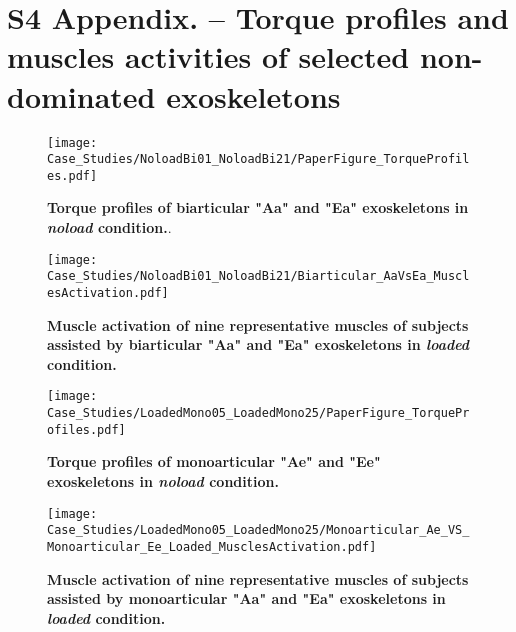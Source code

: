 \documentclass[10pt,letterpaper]{article}
\begin{document}
\section*{S4 Appendix. -- Torque profiles and muscles activities of selected non-dominated exoskeletons} %
\bigskip
\bigskip
\bigskip
\bigskip
\nolinenumbers
\renewcommand{\thefigure}{C\arabic{figure}}
\setcounter{figure}{0}
\begin{figure*}[ht]   
	\centering
	\texttt{[image: Case\_Studies/NoloadBi01\_NoloadBi21/PaperFigure\_TorqueProfiles.pdf]}
	\vspace{1mm}
	\caption{\small{\textbf{Torque profiles of biarticular "Aa" and "Ea" exoskeletons in {\it noload} condition.}}.}
	\label{Fig_TorqueProfiles_Biarticular}
\end{figure*}
\begin{figure*}[ht]   
	\centering
	\texttt{[image: Case\_Studies/NoloadBi01\_NoloadBi21/Biarticular\_AaVsEa\_MusclesActivation.pdf]}
	\vspace{1mm}
	\caption{\small{\textbf{Muscle activation of nine representative muscles of subjects assisted by biarticular "Aa" and "Ea" exoskeletons in {\it loaded} condition.  }}}
	\label{Fig_MuscleActivation_Biarticular}
\end{figure*}
\begin{figure*}[ht]   
	\centering
	\texttt{[image: Case\_Studies/LoadedMono05\_LoadedMono25/PaperFigure\_TorqueProfiles.pdf]}
	\vspace{1mm}
	\caption{\small{\textbf{Torque profiles of monoarticular "Ae" and "Ee" exoskeletons in {\it noload} condition.}}}
	\label{Fig_TorqueProfiles_Monoarticular}
\end{figure*}
\begin{figure*}[ht]   
	\centering
	\texttt{[image: Case\_Studies/LoadedMono05\_LoadedMono25/Monoarticular\_Ae\_VS\_Monoarticular\_Ee\_Loaded\_MusclesActivation.pdf]}
	\vspace{1mm}
	\caption{\small{\textbf{Muscle activation of nine representative muscles of subjects assisted by monoarticular "Aa" and "Ea" exoskeletons in {\it loaded} condition.  }}}
	\label{Fig_MuscleActivation_Monoarticular}
\end{figure*}
\newpage
\clearpage
%
%
%


\end{document}
